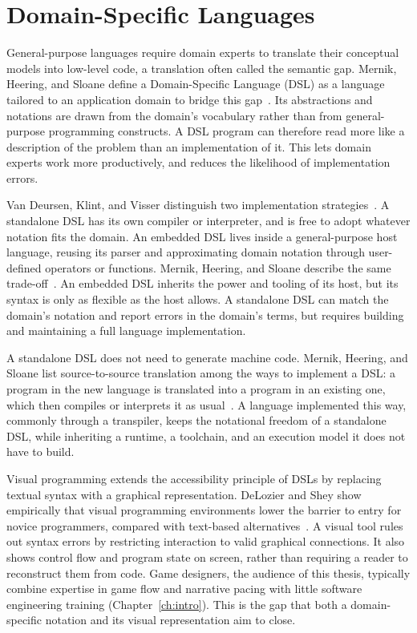 \section{Domain-Specific Languages}
\label{sec:dsl}
 
General-purpose languages require domain experts to translate their conceptual models into low-level code, a translation often called the semantic gap. Mernik, Heering, and Sloane define a Domain-Specific Language (DSL) as a language tailored to an application domain to bridge this gap~\cite{Mernik2005}. Its abstractions and notations are drawn from the domain's vocabulary rather than from general-purpose programming constructs. A DSL program can therefore read more like a description of the problem than an implementation of it. This lets domain experts work more productively, and reduces the likelihood of implementation errors.
 
Van Deursen, Klint, and Visser distinguish two implementation strategies~\cite{vanDeursen2000}. A standalone DSL has its own compiler or interpreter, and is free to adopt whatever notation fits the domain. An embedded DSL lives inside a general-purpose host language, reusing its parser and approximating domain notation through user-defined operators or functions. Mernik, Heering, and Sloane describe the same trade-off~\cite{Mernik2005}. An embedded DSL inherits the power and tooling of its host, but its syntax is only as flexible as the host allows. A standalone DSL can match the domain's notation and report errors in the domain's terms, but requires building and maintaining a full language implementation.
 
A standalone DSL does not need to generate machine code. Mernik, Heering, and Sloane list source-to-source translation among the ways to implement a DSL: a program in the new language is translated into a program in an existing one, which then compiles or interprets it as usual~\cite{Mernik2005}. A language implemented this way, commonly through a transpiler, keeps the notational freedom of a standalone DSL, while inheriting a runtime, a toolchain, and an execution model it does not have to build.
 
Visual programming extends the accessibility principle of DSLs by replacing textual syntax with a graphical representation. DeLozier and Shey show empirically that visual programming environments lower the barrier to entry for novice programmers, compared with text-based alternatives~\cite{DeLozier2023}. A visual tool rules out syntax errors by restricting interaction to valid graphical connections. It also shows control flow and program state on screen, rather than requiring a reader to reconstruct them from code. Game designers, the audience of this thesis, typically combine expertise in game flow and narrative pacing with little software engineering training (Chapter~\ref{ch:intro}). This is the gap that both a domain-specific notation and its visual representation aim to close.
 
